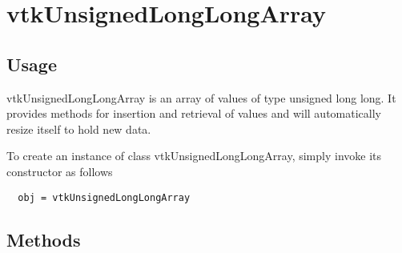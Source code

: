 \section{vtkUnsignedLongLongArray}

\subsection{Usage}

 vtkUnsignedLongLongArray is an array of values of type unsigned long long.
 It provides methods for insertion and retrieval of values and will
 automatically resize itself to hold new data.

To create an instance of class vtkUnsignedLongLongArray, simply
invoke its constructor as follows
\begin{verbatim}
  obj = vtkUnsignedLongLongArray
\end{verbatim}
\subsection{Methods}

